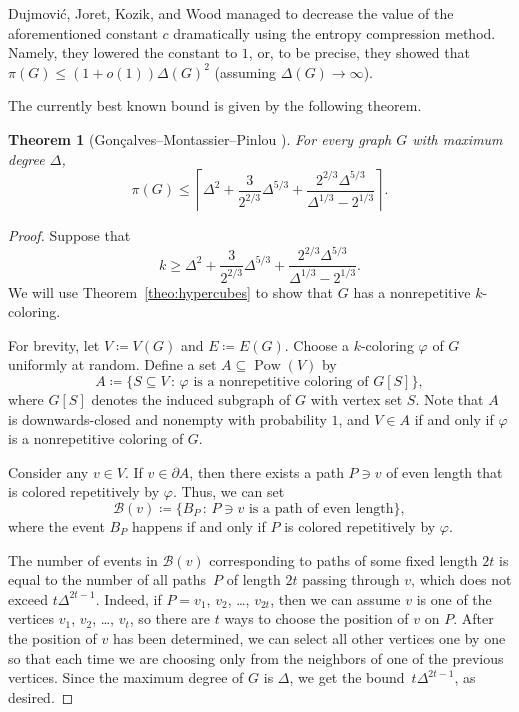 \documentclass[10pt]{article}
\numberwithin{equation}{subsection}
\newtheorem{theo}{Theorem}[section]
\theoremstyle{definition}
\newcommand{\powerset}[1]{\operatorname{Pow}(#1)}
\begin{document}
	Dujmovi\'{c}, Joret, Kozik, and Wood \cite{Duj} managed to decrease the value of the aforementioned constant $c$ dramatically using the entropy compression method. Namely, they lowered the constant to $1$, or, to be precise, they showed that $\pi(G)\leq(1+o(1))\Delta(G)^2$ (assuming $\Delta(G)\to\infty$).
		
	The currently best known bound is given by the following theorem.
		
	\begin{theo}[Gon\c{c}alves--Montassier--Pinlou \cite{Goncalves}]
		For every graph $G$ with maximum degree $\Delta$,
			$$\pi(G) \leq \left\lceil \Delta^2 + \frac{3}{2^{2/3}}\Delta^{5/3} +\frac{2^{2/3} \Delta^{5/3}}{\Delta^{1/3}-2^{1/3}} \right\rceil.$$
	\end{theo}
	
	\begin{proof}
		Suppose that
		\begin{equation}\label{eq:non-repbound}
			k \geq \Delta^2 + \frac{3}{2^{2/3}}\Delta^{5/3} +\frac{2^{2/3} \Delta^{5/3}}{\Delta^{1/3}-2^{1/3}}.
		\end{equation}
		We will use Theorem~\ref{theo:hypercubes} to show that $G$ has a nonrepetitive $k$-coloring.
		
		For brevity, let $V \coloneqq V(G)$ and $E \coloneqq E(G)$. Choose a $k$-coloring $\varphi$ of $G$ uniformly at random. Define a set $A \subseteq \powerset{V}$ by
		$$
			A \coloneqq \{S \subseteq V\,:\, \text{$\varphi$ is a nonrepetitive coloring of $G[S]$}\},
		$$
		where $G[S]$ denotes the induced subgraph of $G$ with vertex set $S$. Note that $A$ is downwards-closed and nonempty with probability $1$, and $V \in A$ if and only if $\varphi$ is a nonrepetitive coloring of $G$.
		
		Consider any $v \in V$. If $v \in \partial A$, then there exists a path $P \ni v$ of even length that is colored repetitively by $\varphi$. Thus, we can set
		$$
			\mathcal{B}(v) \coloneqq \{B_P \,:\, \text{$P \ni v$ is a path of even length}\},
		$$
		where the event $B_P$ happens if and only if $P$ is colored repetitively by $\varphi$.
		
		The number of events in $\mathcal{B}(v)$ corresponding to paths of some fixed length $2t$ is equal to the number of all paths~$P$ of length $2t$ passing through $v$, which does not exceed $t \Delta^{2t -1}$. Indeed, if $P = v_1$, $v_2$, \ldots, $v_{2t}$, then we can assume $v$ is one of the vertices $v_1$, $v_2$, \ldots, $v_t$, so there are $t$ ways to choose the position of $v$ on $P$. After the position of $v$ has been determined, we can select all other vertices one by one so that each time we are choosing only from the neighbors of one of the previous vertices. Since the maximum degree of $G$ is $\Delta$, we get the bound~$t \Delta^{2t-1}$, as desired.
		

\end{proof}
\end{document}
